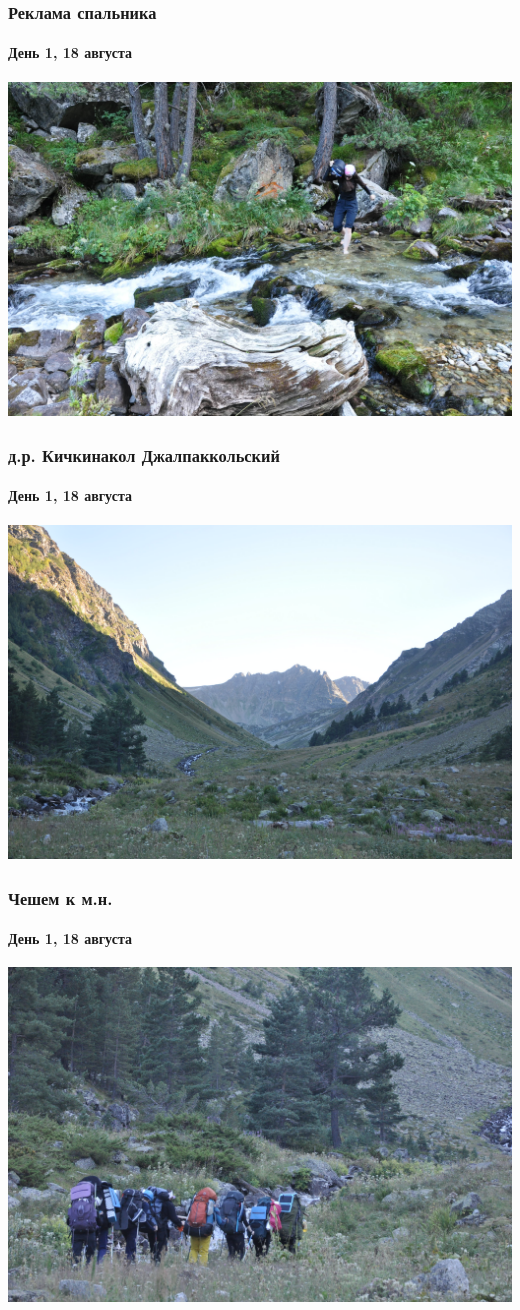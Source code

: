\begin{frame}
	\frametitle{Реклама спальника}
	\framesubtitle{День 1, 18 августа}
	\centering
	\includegraphics[width=\linewidth]{../pics/DSC_0550}
\end{frame}

\begin{frame}
	\frametitle{д.р. Кичкинакол Джалпаккольский}
	\framesubtitle{День 1, 18 августа}
	\centering
	\includegraphics[width=\linewidth]{../pics/DSC_0558}
\end{frame}

\begin{frame}
	\frametitle{Чешем к м.н.}
	\framesubtitle{День 1, 18 августа}
	\centering
	\includegraphics[width=\linewidth]{../pics/DSC_0559}
\end{frame}

